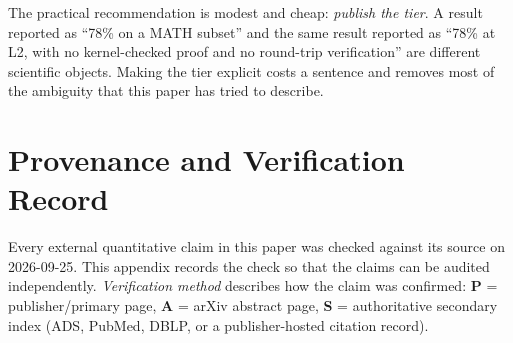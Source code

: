 \documentclass[11pt,a4paper]{article}
\theoremstyle{plain}
\theoremstyle{remark}
\begin{document}
The practical recommendation is modest and cheap: \emph{publish the tier}.  A
result reported as ``78\% on a MATH subset'' and the same result reported as
``78\% at L2, with no kernel-checked proof and no round-trip verification''
are different scientific objects.  Making the tier explicit costs a sentence
and removes most of the ambiguity that this paper has tried to describe.

\appendix
\section{Provenance and Verification Record}
\label{app:provenance}

Every external quantitative claim in this paper was checked against its source
on 2026-09-25.  This appendix records the check so that the claims can be
audited independently.  \emph{Verification method} describes how the claim was
confirmed: \textbf{P} = publisher/primary page, \textbf{A} = arXiv abstract
page, \textbf{S} = authoritative secondary index (ADS, PubMed, DBLP, or a
publisher-hosted citation record).
\end{document}

